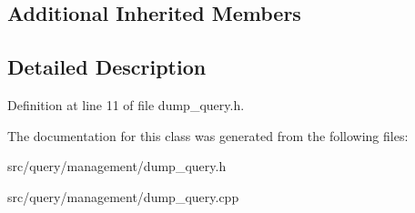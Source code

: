 \subsection*{Additional Inherited Members}


\subsection{Detailed Description}


Definition at line 11 of file dump\+\_\+query.\+h.



The documentation for this class was generated from the following files\+:\begin{DoxyCompactItemize}
\item 
src/query/management/dump\+\_\+query.\+h\item 
src/query/management/dump\+\_\+query.\+cpp\end{DoxyCompactItemize}
